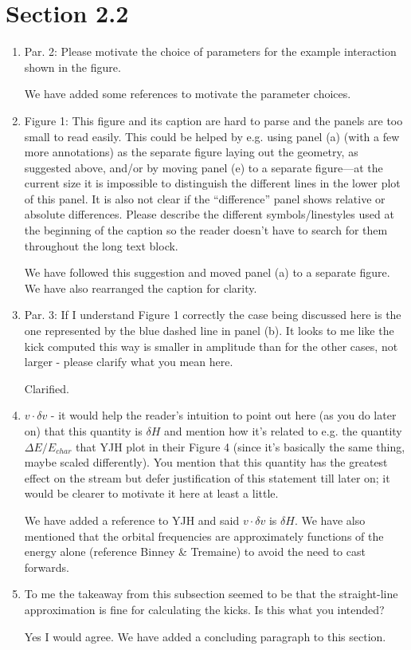 \documentclass{article}
\begin{document}
\section{Section 2.2}
\begin{enumerate}
\item Par. 2: Please motivate the choice of parameters for the example interaction shown in
the figure.

{\color{red} We have added some references to motivate the parameter choices.}

\item Figure 1: This figure and its caption are hard to parse and the panels are too small to
read easily. This could be helped by e.g. using panel (a) (with a few more annotations)
as the separate figure laying out the geometry, as suggested above, and/or by moving
panel (e) to a separate figure—at the current size it is impossible to distinguish the
different lines in the lower plot of this panel. It is also not clear if the “difference” panel
shows relative or absolute differences. Please describe the different symbols/linestyles
used at the beginning of the caption so the reader doesn’t have to search for them
throughout the long text block.

{\color{red} We have followed this suggestion and moved panel (a) to a separate figure. We have also rearranged the caption for clarity.}

\item Par. 3: If I understand Figure 1 correctly the case being discussed here is the one
represented by the blue dashed line in panel (b). It looks to me like the kick computed
this way is smaller in amplitude than for the other cases, not larger - please clarify what
you mean here.

{\color{red} Clarified.}

\item $v \cdot \delta v$ - it would help the reader’s intuition to point out here (as you do later on)
that this quantity is $\delta H$ and mention how it’s related to e.g. the quantity $\Delta
E/E_{char}$ that YJH plot in their Figure 4 (since it’s basically the same thing, maybe
scaled differently). You mention that this quantity has the greatest effect on the stream
but defer justification of this statement till later on; it would be clearer to motivate it here
at least a little.

{\color{red} We have added a reference to YJH and said $v \cdot \delta v$ is $\delta H$. We have also mentioned that the orbital frequencies are approximately functions of the energy alone (reference Binney \& Tremaine) to avoid the need to cast forwards.}


\item To me the takeaway from this subsection seemed to be that the straight-line
approximation is fine for calculating the kicks. Is this what you intended?

{\color{red} Yes I would agree. We have added a concluding paragraph to this section.}

\end{enumerate}
\end{document}
